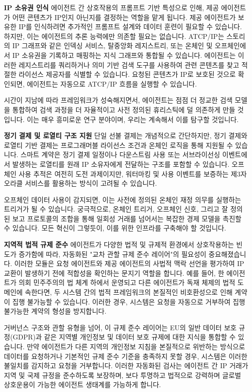 \documentclass[journal,onecolumn]{IEEEtran} %
\begin{document}
\noindent\textbf{IP 소유권 인식}
에이전트 간 상호작용의 프롬프트 기반 특성으로 인해, 제공 에이전트가 어떤 콘텐츠가 IP인지 아닌지를 결정하는 역할을 맡게 됩니다. 제공 에이전트가 보유한 IP를 인식하려면 추가적인 프롬프트 설계와 데이터 훈련이 필요할 수 있습니다. 하지만, 이는 에이전트의 추론 능력에만 의존할 필요는 없습니다. ATCP/IP는 스토리의 IP 그래프와 같은 인덱싱 서비스, 탈중앙화 레지스트리, 또는 온체인 및 오프체인에서 IP 소유권을 기록하고 매핑하는 지식 그래프와 통합될 수 있습니다. 에이전트는 이러한 레지스트리를 쿼리하거나 의미 기반 검색 도구를 사용하여 관련 콘텐츠를 찾고 적절한 라이선스 제공자를 식별할 수 있습니다. 요청된 콘텐츠가 IP로 보호된 것으로 확인되면, 에이전트는 자동으로 ATCP/IP 흐름을 실행할 수 있습니다.

시간이 지남에 따라 프레임워크가 성숙해지면서, 에이전트는 점점 더 정교한 검색 모델을 통합하여 검색 과정을 더 자율적이고 사전 정의된 휴리스틱에 덜 의존하게 만들 것입니다. 이는 매우 흥미로운 연구 분야이며, 우리는 계속해서 이를 탐구할 것입니다.

\noindent\textbf{정기 결제 및 로열티 구조 지원}
단일 선불 결제는 개념적으로 간단하지만, 정기 결제와 로열티 기반 결제는 프로그래머블 라이선스 조건과 온체인 로직을 통해 지원될 수 있습니다. 스마트 계약은 정기 결제 일정이나 다운스트림 사용 또는 서브라이선싱 이벤트에서 발생하는 로열티를 원래 IP 소유자에게 전달하는 구조를 포함할 수 있습니다. 오프체인 사용 추적은 여전히 도전 과제이지만, 워터마킹 및 사용 이벤트를 보증하는 제3자 오라클 서비스를 활용하는 방식이 고려될 수 있습니다.

오프체인 데이터 사용이 감지되면, 이는 사전에 정의된 온체인 재정 의무를 실행하는 트리거가 될 수 있습니다. 궁극적으로, 온체인 트리거, 오프체인 신호, 그리고 잘 정의된 보고 프로토콜의 조합을 통해 일회성 거래를 넘어서는 복잡한 경제 모델을 촉진할 수 있습니다. 모든 혁신이 그렇듯이, 이를 위한 인프라를 구축해야 할 것입니다.

\noindent\textbf{지역적 법적 규제 준수}
에이전트가 다양한 법적 및 규제적 환경에서 상호작용하는 빈도가 증가함에 따라, 자동화된 "교차 관할 규제 준수 레이어"의 필요성이 중요해졌습니다. 이러한 모듈은 요청 에이전트와 제공 에이전트의 사법적 맥락 선언을 평가하여 IP 교환이 발생하기 전에 적합성을 확인하는 문지기 역할을 합니다. 예를 들어, 한 에이전트가 의회 민주주의의 법 체계 하에서 운영되고 다른 에이전트가 독재 체제의 법적 도메인에 속한다면, 두 시스템 간의 법적 프레임워크의 본질적인 비호환성으로 인해 계약이 집행 불가능할 수 있습니다. 이러한 경우, 시스템은 요청을 자동으로 거부하여 집행 불가능한 계약의 형성을 방지합니다.

거버넌스 구조와 관할 유형을 넘어, 이 규제 준수 레이어는 EU의 일반 데이터 보호 규정(GDPR)과 같은 지역별 개인정보 및 데이터 보호 규제에 대한 지식을 통합할 수 있습니다. 만약 에이전트가 다른 지역의 개인정보 지침을 본질적으로 위반하는 방식으로 데이터를 요청하거나 기본적인 규제 준수 기준을 충족하지 못할 경우, 시스템은 이러한 불일치를 감지하고 요청을 거부합니다. 이러한 자동화된 검사는 에이전트 간 IP 거래가 지역 및 국제 규정을 준수하도록 보장하며, 보다 투명하고 법적으로 강력하며 글로벌 상호운용이 가능한 에이전트 생태계를 가능하게 합니다.
\end{document}
